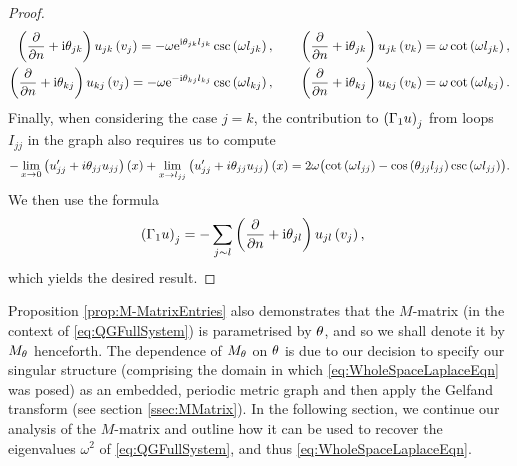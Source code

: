 \begin{proof}
\begin{align*}
		\left( \dfrac{\partial }{\partial n}+\mathrm{i}\theta_{jk} \right)u_{jk}\left( v_j \right) = -\omega \mathrm{e}^{\mathrm{i}\theta_{jk}l_{jk}}\csc\left( \omega l_{jk} \right), 
		&\qquad \left( \dfrac{\partial }{\partial n}+\mathrm{i}\theta_{jk} \right)u_{jk}\left( v_k \right) = \omega\cot\left( \omega l_{jk} \right), \\
		\left( \dfrac{\partial }{\partial n}+\mathrm{i}\theta_{kj} \right)u_{kj}\left( v_j \right) = -\omega \mathrm{e}^{-\mathrm{i}\theta_{kj}l_{kj}}\csc\left( \omega l_{kj} \right), 
		&\qquad \left( \dfrac{\partial }{\partial n}+\mathrm{i}\theta_{kj} \right)u_{kj}\left( v_k \right) = \omega\cot\left( \omega l_{kj} \right).
	\end{align*}
	Finally, when considering the case $j=k$, the contribution to $\left( \Gamma_1 u \right)_j$ from loops $I_{jj}$ in the graph also requires us to compute
	\begin{align*}
		-\lim_{x\rightarrow0}\left( u_{jj}'+i\theta_{jj}u_{jj} \right)(x) + \lim_{x\rightarrow l_{jj}}\left( u_{jj}'+i\theta_{jj}u_{jj} \right)(x)
		= 2\omega\bigl( \cot\left( \omega l_{jj} \right) - \cos\left( \theta_{jj}l_{jj} \right)\csc\left( \omega l_{jj} \right) \bigr).	
	\end{align*}
	We then use the formula
	\begin{align*}
		\left( \Gamma_1 u \right)_j &= -\sum_{j\sim l} \left( \dfrac{\partial }{\partial n}+\mathrm{i}\theta_{jl} \right)u_{jl}\left( v_j \right),
	\end{align*}
	which yields the desired result.
\end{proof}

Proposition \ref{prop:M-MatrixEntries} also demonstrates that the $M$-matrix (in the context of \eqref{eq:QGFullSystem}) is parametrised by $\theta$, and so we shall denote it by $M_{\theta}$ henceforth.
The dependence of $M_\theta$ on $\theta$ is due to our decision to specify our singular structure (comprising the domain in which \eqref{eq:WholeSpaceLaplaceEqn} was posed) as an embedded, periodic metric graph and then apply the Gelfand transform (see section \ref{ssec:MMatrix}).
In the following section, we continue our analysis of the $M$-matrix and outline how it can be used to recover the eigenvalues $\omega^2$ of \eqref{eq:QGFullSystem}, and thus \eqref{eq:WholeSpaceLaplaceEqn}.

